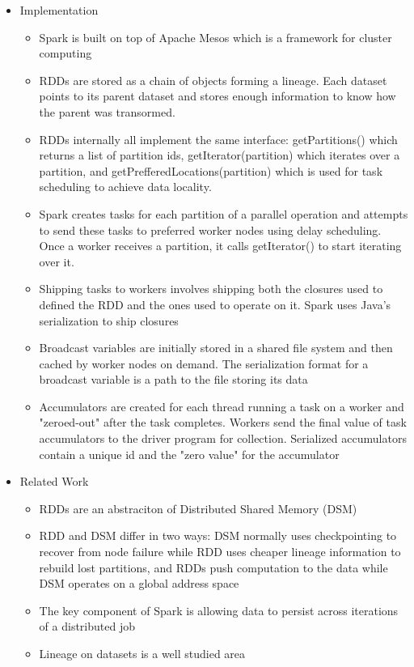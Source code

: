 \documentclass[a4paper]{article}
\begin{document}
\begin{itemize}
\begin{itemize}
\item Implementation
\begin{itemize}
\item Spark is built on top of Apache Mesos which is a framework for cluster computing

\item RDDs are stored as a chain of objects forming a lineage. Each dataset points to its parent dataset and stores enough information to know how the parent was transormed.

\item RDDs internally all implement the same interface: getPartitions() which returns a list of partition ids, getIterator(partition) which iterates over a partition, and getPrefferedLocations(partition) which is used for task scheduling to achieve data locality.

\item Spark creates tasks for each partition of a parallel operation and attempts to send these tasks to preferred worker nodes using delay scheduling. Once a worker receives a partition, it calls getIterator() to start iterating over it.

\item Shipping tasks to workers involves shipping both the closures used to defined the RDD and the ones used to operate on it. Spark uses Java's serialization to ship closures

\item Broadcast variables are initially stored in a shared file system and then cached by worker nodes on demand. The serialization format for a broadcast variable is a path to the file storing its data

\item Accumulators are created for each thread running a task on a worker and "zeroed-out" after the task completes. Workers send the final value of task accumulators to the driver program for collection. Serialized accumulators contain a unique id and the "zero value" for the accumulator
\end{itemize}

\item Related Work
\begin{itemize}
\item RDDs are an abstraciton of Distributed Shared Memory (DSM)

\item RDD and DSM differ in two ways: DSM normally uses checkpointing to recover from node failure while RDD uses cheaper lineage information to rebuild lost partitions, and RDDs push computation to the data while DSM operates on a global address space

\item The key component of Spark is allowing data to persist across iterations of a distributed job

\item Lineage on datasets is a well studied area
\end{itemize}

\end{itemize}

\end{itemize}
\end{document}
